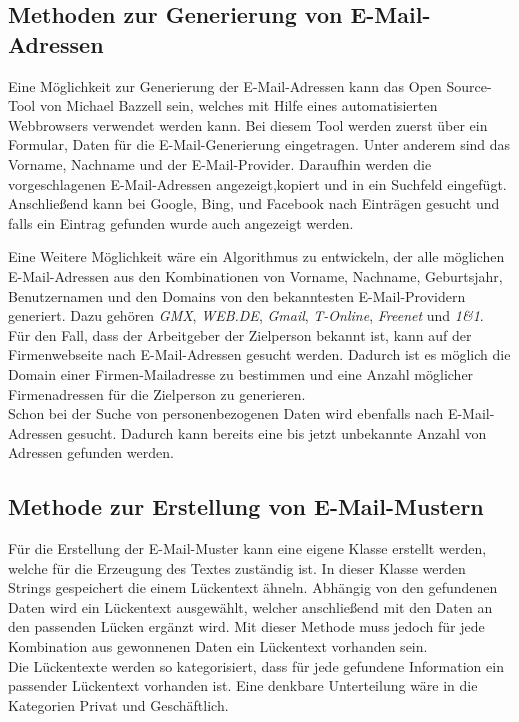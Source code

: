 	\subsection{Methoden zur Generierung von E-Mail-Adressen}
	Eine Möglichkeit zur Generierung der E-Mail-Adressen kann das Open Source-Tool von Michael Bazzell \cite{EmailAssumptions} sein, welches mit Hilfe eines automatisierten Webbrowsers verwendet werden kann. Bei diesem Tool werden zuerst über ein Formular, Daten für die E-Mail-Generierung eingetragen. Unter anderem sind das Vorname, Nachname und der E-Mail-Provider. Daraufhin werden die vorgeschlagenen E-Mail-Adressen angezeigt,kopiert und in ein Suchfeld eingefügt. Anschließend kann bei Google, Bing, und Facebook nach Einträgen gesucht und falls ein Eintrag gefunden wurde auch angezeigt werden.

	Eine Weitere Möglichkeit wäre ein Algorithmus zu entwickeln, der alle möglichen E-Mail-Adressen aus den Kombinationen von Vorname, Nachname, Geburtsjahr, Benutzernamen und den Domains von den bekanntesten E-Mail-Providern generiert. Dazu gehören \textit{GMX}, \textit{WEB.DE}, \textit{Gmail}, \textit{T-Online}, \textit{Freenet} und \textit{1\&1}.\cite{AnbieterMail} \\
	Für den Fall, dass der Arbeitgeber der Zielperson bekannt ist, kann auf der Firmenwebseite nach E-Mail-Adressen gesucht werden. Dadurch ist es möglich die Domain einer Firmen-Mailadresse zu bestimmen und eine Anzahl  möglicher Firmenadressen für die Zielperson zu generieren.\\
	Schon bei der Suche von personenbezogenen Daten wird ebenfalls nach E-Mail-Adressen gesucht. Dadurch kann bereits eine bis jetzt unbekannte Anzahl von Adressen gefunden werden.


	\subsection{Methode zur Erstellung von E-Mail-Mustern}
	Für die Erstellung der E-Mail-Muster kann eine eigene Klasse erstellt werden, welche für die Erzeugung des Textes zuständig ist. In dieser Klasse werden Strings gespeichert die einem Lückentext ähneln. Abhängig von den gefundenen Daten wird ein Lückentext ausgewählt, welcher anschließend mit den Daten an den passenden Lücken ergänzt wird. Mit dieser Methode muss jedoch für jede Kombination aus gewonnenen Daten ein Lückentext vorhanden sein.\\
	Die Lückentexte werden so kategorisiert, dass für jede gefundene Information ein passender Lückentext vorhanden ist. Eine denkbare Unterteilung wäre in die Kategorien Privat und Geschäftlich.


